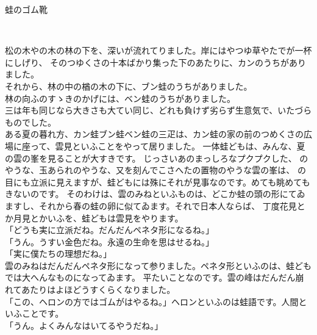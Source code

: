 \documentclass[
a4paper,
10pt,
book]
{tarticle}
\begin{document}
\Large

\thispagestyle{empty}
{\fontsize{30pt}{24pt}\selectfont
蛙のゴム靴\\
\begin{flushright}
\\
\end{flushright}
}
\newpage
\pagewiselinenumbers
\thispagestyle{fancy}
\setcounter{page}{2}

\indent 松の木やの木の林の下を、深いが流れてりました。岸にはやつゆ草やたでが一杯にしげり、
そのつゆくさの十本ばかり集った下のあたりに、カンのうちがありました。\\
\indent それから、林の中の楢の木の下に、ブン蛙のうちがありました。\\
\indent 林の向ふのすゝきのかげには、ベン蛙のうちがありました。\\
\indent 三は年も同じなら大きさも大てい同じ、どれも負けず劣らず生意気で、いたづらものでした。\\
\indent ある夏の暮れ方、カン蛙ブン蛙ベン蛙の三疋は、カン蛙の家の前のつめくさの広場に座って、雲見といふことをやって居りました。
一体蛙どもは、みんな、夏の雲の峯を見ることが大すきです。
じっさいあのまっしろなプクプクした、
のやうな、玉あられのやうな、又を刻んでこさへたの置物のやうな雲の峯は、
の目にも立派に見えますが、蛙どもには殊にそれが見事なのです。めても眺めてもきないのです。
そのわけは、雲のみねといふものは、どこか蛙の頭の形にてゐますし、それから春の蛙の卵に似てゐます。それで日本人ならば、
丁度花見とか月見とかいふを、蛙どもは雲見をやります。\\
「どうも実に立派だね。だんだんペネタ形になるね。」\\
「うん。うすい金色だね。永遠の生命を思はせるね。」\\
「実に僕たちの理想だね。」\\
\indent 雲のみねはだんだんペネタ形になって参りました。ペネタ形といふのは、蛙どもでは大へんなものになってゐます。
平たいことなのです。雲の峰はだんだん崩れてあたりはよほどうすくらくなりました。\\
「この、ヘロンの方ではゴムがはやるね。」ヘロンといふのは蛙語です。人間といふことです。\\
「うん。よくみんなはいてるやうだね。」
\end{document}
